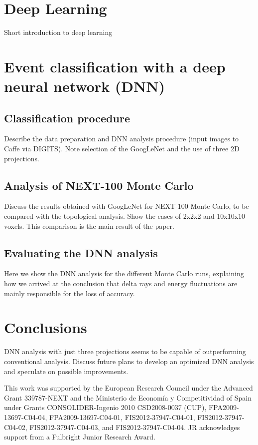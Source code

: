 \documentclass{JINST}
\begin{document}
\section{Deep Learning}
Short introduction to deep learning

\section{Event classification with a deep neural network (DNN)}
\subsection{Classification procedure}
Describe the data preparation and DNN analysis procedure (input images to Caffe via DIGITS).  Note selection of the GoogLeNet and the use of three 2D projections.

\subsection{Analysis of NEXT-100 Monte Carlo}
Discuss the results obtained with GoogLeNet for NEXT-100 Monte Carlo, to be compared with the topological analysis.  Show the cases of 2x2x2 and 10x10x10 voxels.  This comparison is
the main result of the paper.

\subsection{Evaluating the DNN analysis}
Here we show the DNN analysis for the different Monte Carlo runs, explaining how we arrived at the conclusion that delta rays and energy fluctuations are mainly responsible for the
loss of accuracy.

\section{Conclusions}
DNN analysis with just three projections seems to be capable of outperforming conventional analysis.  Discuss future plans to develop an optimized DNN analysis and speculate
on possible improvements.



\acknowledgments

This work was supported by the European Research Council under the Advanced Grant 339787-NEXT and the Ministerio de Econom\'{i}a y Competitividad of Spain under Grants CONSOLIDER-Ingenio 2010 CSD2008-0037 (CUP), FPA2009-13697-C04-04, FPA2009-13697-C04-01, FIS2012-37947-C04-01, FIS2012-37947-C04-02, FIS2012-37947-C04-03, and FIS2012-37947-C04-04.  JR acknowledges support from a Fulbright Junior Research Award.


\end{document}
